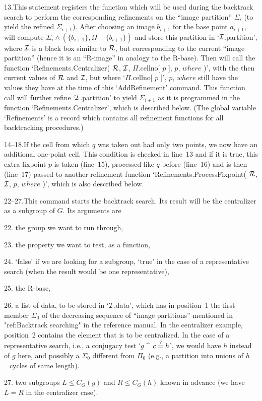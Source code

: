 13.\enspace  This statement registers  the   function which will be  used
during the  backtrack search to perform  the corresponding refinements on
the ``image partition'' $\Sigma_i$ (to yield the refined $\Sigma_{i+1}$).
After choosing an image  $b_{i+1}$ for the  base point $a_{i+1}$,  {\GAP}
will compute $\Sigma_i \wedge (\{b_{i+1}\},\Omega-\{b_{i+1}\})$ and store
this partition in `${\cal I}$.partition', where ${\cal I}$  is a black box similar to
${\cal R}$, but  corresponding to the current  ``image partition'' (hence it is
an   ``R-image'' in analogy  to the  R-base). Then {\GAP}   will call the
function `Refinements.Centralizer( ${\cal R}$, ${\cal I}$,  $\Pi$.cellno[ $p$ ], $p$,
$where$  )',  with the  then current values  of ${\cal R}$  and ${\cal I}$, but where
`$\Pi$.cellno[ $p$ ]',  $p$, $where$ still  have the values they  have at
the time of this `AddRefinement' command. This function call will further
refine  `${\cal I}$.partition' to yield $\Sigma_{i+1}$ as  it  is programmed in
the function `Refinements.Centralizer',  which  is described  below. (The
global  variable `Refinements' is  a record which contains all refinement
functions for all backtracking procedures.)

14--18.\enspace If  the cell from which  $q$ was taken  out  had only two
points, we   now have an   additional one-point  cell. This  condition is
checked  in line~13 and if it  is true, this  extra fixpoint $p$ is taken
(line~15), processed like $q$  before   (line~16) and is then   (line~17)
passed to another refinement function `Refinements.ProcessFixpoint( ${\cal R}$,
${\cal I}$, $p$, $where$ )', which is also described below.

22--27.\enspace This command starts the backtrack search. Its result will
be the centralizer as a subgroup of $G$. Its arguments are
\beginlist
  \item{22.} the group we want to run through,
  \item{23.} the property we want to test, as a {\GAP} function,
  \item{24.} `false' if we are looking for a subgroup, `true' in the case
    of   a  representative  search    (when  the result   would    be one
    representative),
  \item{25.} the R-base,
  \item{26.} a list  of data, to be stored  in `${\cal I}$.data', which has
    in position~1 the first member $\Sigma_0$  of the decreasing sequence
    of ``image partitions'' mentioned in "ref:Backtrack searching" in the
    reference manual. In the centralizer example, position~2 contains the
    element that is  to be centralized. In the  case of  a representative
    search,  i.e.,  a conjugacy test  `$g$  ^ $c \buildrel?\over= h$', we
    would  have $h$   instead of  $g$   here, and   possibly a $\Sigma_0$
    different from $\Pi_0$ (e.g., a  partition into unions of  $h$=cycles
    of same length).
  \item{27.} two subgroups  $L\le  C_G(g)$  and  $R\le  C_G(h)$ known  in
    advance (we have $L=R$ in the centralizer case).
\endlist

